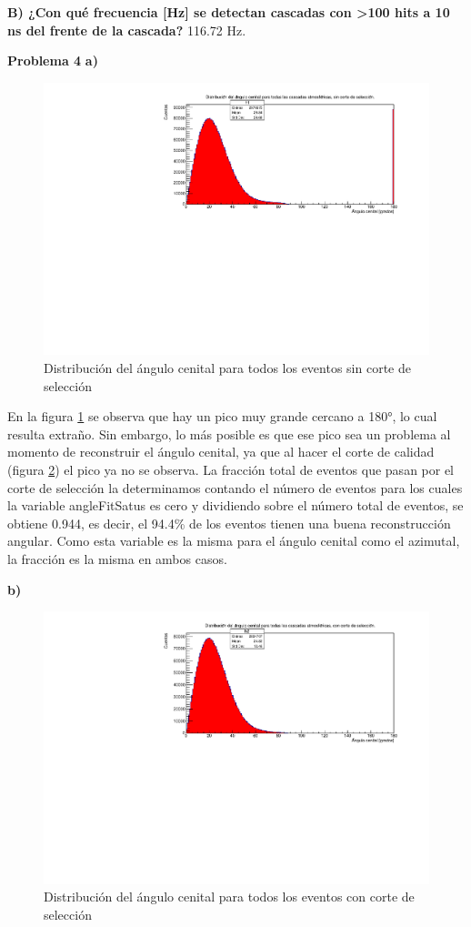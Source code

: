 \documentclass[11pt]{article}
\begin{document}
\textbf{B) ¿Con qué frecuencia [Hz] se detectan cascadas con >100 hits a 10 ns del frente de la cascada?}
116.72 Hz.
\pagebreak

\textbf{Problema 4}
\textbf{a)}
\begin{figure}[H]
\centering
\includegraphics[width=1\textwidth]{../Figuras/Prob4A}
\caption{Distribución del ángulo cenital para todos los eventos sin corte de selección}
\label{fig:Prob4A}
\end{figure}
En la figura \ref{fig:Prob4A} se observa que hay un pico muy grande cercano a 180°, lo cual resulta extraño. Sin embargo, lo más posible es que ese pico sea un problema al momento de reconstruir el ángulo cenital, ya que al hacer el corte de calidad (figura \ref{fig:Prob4B}) el pico ya no se observa. La fracción total de eventos que pasan por el corte de selección la determinamos contando el número de eventos para los cuales la variable angleFitSatus es cero y dividiendo sobre el número total de eventos, se obtiene 0.944, es decir, el 94.4\% de los eventos tienen una buena reconstrucción angular. Como esta variable es la misma para el ángulo cenital como el azimutal, la fracción es la misma en ambos casos.

\textbf{b)}
\begin{figure}[H]
\centering
\includegraphics[width=1\textwidth]{../Figuras/Prob4B}
\caption{Distribución del ángulo cenital para todos los eventos con corte de selección}
\label{fig:Prob4B}
\end{figure}
\pagebreak
\end{document}
